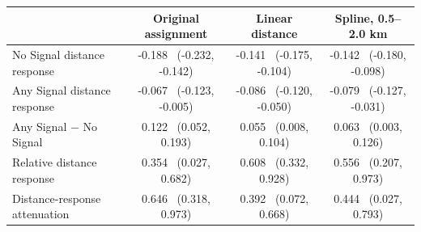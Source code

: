 \begin{tabular}{lccc}
\toprule
 & Original assignment & Linear distance & Spline, 0.5--2.0 km \\
\midrule
No Signal distance response & -0.188 \ (-0.232, -0.142) & -0.141 \ (-0.175, -0.104) & -0.142 \ (-0.180, -0.098) \\
Any Signal distance response & -0.067 \ (-0.123, -0.005) & -0.086 \ (-0.120, -0.050) & -0.079 \ (-0.127, -0.031) \\
Any Signal $-$ No Signal & 0.122 \ (0.052, 0.193) & 0.055 \ (0.008, 0.104) & 0.063 \ (0.003, 0.126) \\
Relative distance response & 0.354 \ (0.027, 0.682) & 0.608 \ (0.332, 0.928) & 0.556 \ (0.207, 0.973) \\
Distance-response attenuation & 0.646 \ (0.318, 0.973) & 0.392 \ (0.072, 0.668) & 0.444 \ (0.027, 0.793) \\
\bottomrule
\end{tabular}
